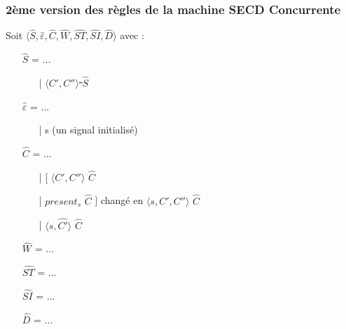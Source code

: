 \documentclass[10pt,a4paper]{article}
\begin{document}
				
				
				\subsubsection{2ème version des règles de la machine SECD Concurrente}\label{SECDConc2}
				Soit $\langle\widehat{S},\widehat{\varepsilon},\widehat{C},\widehat{W},\widehat{ST},\widehat{SI},\widehat{D}\rangle$ avec :
				
				\begin{itemize}
					\item[] $\widehat{S}$  = ... 
					\begin{itemize}
						\item[|] \sout{$\langle C',C''\rangle$ $\widehat{S}$}
					\end{itemize}
					\item[] $\widehat{\varepsilon}$ = ... 
					\begin{itemize}
						\item[|] s (un signal initialisé)
					\end{itemize}
					\item[] $\widehat{C}$  = ... 
					\begin{itemize}
						\item[|] [ $\langle C',C''\rangle$ $\widehat{C}$ 
						\item[|] $present_{s}$ $\widehat{C}$ ] changé en $\langle s,C',C''\rangle$ $\widehat{C}$
						\item[|] $\langle s,\widehat{C'}\rangle$ $\widehat{C}$ 
					\end{itemize}
					\item[] $\widehat{W}$  = ...
					\item[] $\widehat{ST}$ = ...
					\item[] $\widehat{SI}$ = ...
					\item[] $\widehat{D}$  = ...
				\end{itemize}
				\bigbreak
				
\end{document}
